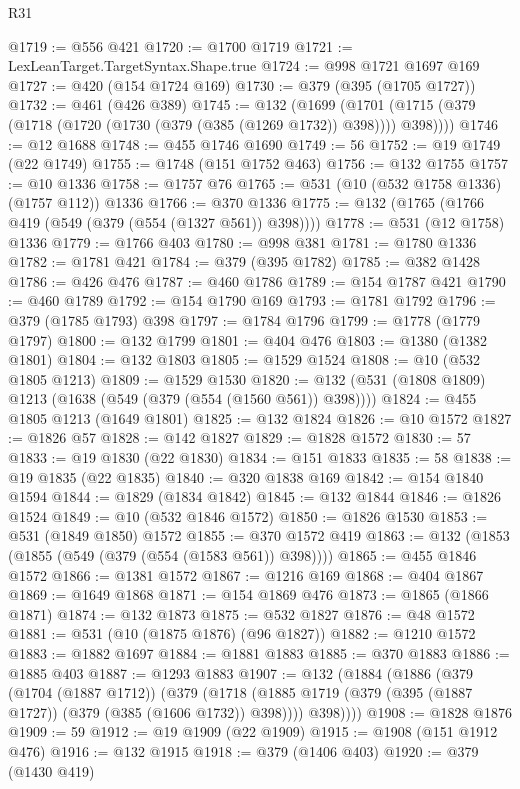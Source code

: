 \begin{lexlean}{R31}
\begin{coremodule}
@1719 := @556 @421
@1720 := @1700 @1719
@1721 := LexLeanTarget.TargetSyntax.Shape.true
@1724 := @998 @1721 @1697 @169
@1727 := @420 (@154 @1724 @169)
@1730 := @379 (@395 (@1705 @1727))
@1732 := @461 (@426 @389)
@1745 := @132
    (@1699 (@1701 (@1715 (@379 (@1718 (@1720 (@1730 (@379 (@385 (@1269 @1732)) @398)))) @398))))
@1746 := @12 @1688
@1748 := @455 @1746 @1690
@1749 := 56
@1752 := @19 @1749 (@22 @1749)
@1755 := @1748 (@151 @1752 @463)
@1756 := @132 @1755
@1757 := @10 @1336
@1758 := @1757 @76
@1765 := @531 (@10 (@532 @1758 @1336) (@1757 @112)) @1336
@1766 := @370 @1336
@1775 := @132 (@1765 (@1766 @419 (@549 (@379 (@554 (@1327 @561)) @398))))
@1778 := @531 (@12 @1758) @1336
@1779 := @1766 @403
@1780 := @998 @381
@1781 := @1780 @1336
@1782 := @1781 @421
@1784 := @379 (@395 @1782)
@1785 := @382 @1428
@1786 := @426 @476
@1787 := @460 @1786
@1789 := @154 @1787 @421
@1790 := @460 @1789
@1792 := @154 @1790 @169
@1793 := @1781 @1792
@1796 := @379 (@1785 @1793) @398
@1797 := @1784 @1796
@1799 := @1778 (@1779 @1797)
@1800 := @132 @1799
@1801 := @404 @476
@1803 := @1380 (@1382 @1801)
@1804 := @132 @1803
@1805 := @1529 @1524
@1808 := @10 (@532 @1805 @1213)
@1809 := @1529 @1530
@1820 := @132 (@531 (@1808 @1809) @1213 (@1638 (@549 (@379 (@554 (@1560 @561)) @398))))
@1824 := @455 @1805 @1213 (@1649 @1801)
@1825 := @132 @1824
@1826 := @10 @1572
@1827 := @1826 @57
@1828 := @142 @1827
@1829 := @1828 @1572
@1830 := 57
@1833 := @19 @1830 (@22 @1830)
@1834 := @151 @1833
@1835 := 58
@1838 := @19 @1835 (@22 @1835)
@1840 := @320 @1838 @169
@1842 := @154 @1840 @1594
@1844 := @1829 (@1834 @1842)
@1845 := @132 @1844
@1846 := @1826 @1524
@1849 := @10 (@532 @1846 @1572)
@1850 := @1826 @1530
@1853 := @531 (@1849 @1850) @1572
@1855 := @370 @1572 @419
@1863 := @132 (@1853 (@1855 (@549 (@379 (@554 (@1583 @561)) @398))))
@1865 := @455 @1846 @1572
@1866 := @1381 @1572
@1867 := @1216 @169
@1868 := @404 @1867
@1869 := @1649 @1868
@1871 := @154 @1869 @476
@1873 := @1865 (@1866 @1871)
@1874 := @132 @1873
@1875 := @532 @1827
@1876 := @48 @1572
@1881 := @531 (@10 (@1875 @1876) (@96 @1827))
@1882 := @1210 @1572
@1883 := @1882 @1697
@1884 := @1881 @1883
@1885 := @370 @1883
@1886 := @1885 @403
@1887 := @1293 @1883
@1907 := @132
    (@1884
      (@1886
        (@379
          (@1704 (@1887 @1712))
          (@379
            (@1718 (@1885 @1719 (@379 (@395 (@1887 @1727)) (@379 (@385 (@1606 @1732)) @398))))
            @398))))
@1908 := @1828 @1876
@1909 := 59
@1912 := @19 @1909 (@22 @1909)
@1915 := @1908 (@151 @1912 @476)
@1916 := @132 @1915
@1918 := @379 (@1406 @403)
@1920 := @379 (@1430 @419)

\end{coremodule}
\end{lexlean}
